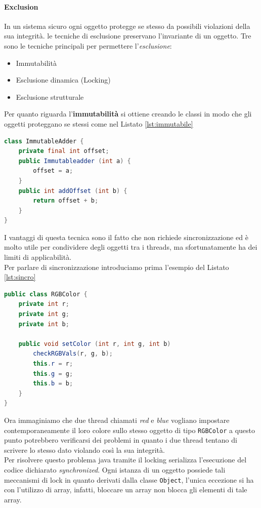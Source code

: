 \paragraph{Exclusion}
In un sistema sicuro ogni oggetto protegge se stesso da possibili violazioni della sua integrità. le tecniche di esclusione preservano l'invariante di un oggetto. Tre sono le tecniche principali per permettere l'\emph{esclusione}:
\begin{itemize}
\item Immutabilità
\item Esclusione dinamica (Locking)
\item Esclusione strutturale
\end{itemize}
Per quanto riguarda l'\textbf{immutabilità} si ottiene creando le classi in modo che gli oggetti proteggano se stessi come nel  Listato \ref{lst:immutabile}
\begin{lstlisting}[language=Java,caption={Esempio di oggetto immutabile},label=lst:immutabile]
class ImmutableAdder {
	private final int offset;
	public Immutableadder (int a) {
		offset = a;
	}
	public int addOffset (int b) {
		return offset + b;
	}
}
\end{lstlisting}
I vantaggi di questa tecnica sono il fatto che non richiede sincronizzazione ed è molto utile per condividere degli oggetti tra i threads, ma sfortunatamente ha dei limiti di applicabilità.\\
Per parlare di sincronizzazione introduciamo prima l'esempio del  Listato \ref{lst:sincro}
\begin{lstlisting}[language=Java,caption={Esempio sincronizzazione},label=lst:sincro]
public class RGBColor {
	private int r;
	private int g;
	private int b;
	
	public void setColor (int r, int g, int b)
		checkRGBVals(r, g, b);
		this.r = r;
		this.g = g;
		this.b = b;
	}
}
\end{lstlisting}
Ora immaginiamo che due thread chiamati \emph{red} e \emph{blue} vogliano impostare contemporaneamente il loro colore sullo stesso oggetto di tipo \texttt{RGBColor} a questo punto potrebbero verificarsi dei problemi in quanto i due thread tentano di scrivere lo stesso dato violando così la sua integrità.\\
Per risolvere questo problema java tramite il locking serializza l'esecuzione del codice dichiarato \emph{synchronized}. Ogni istanza di un oggetto possiede tali meccanismi di lock in quanto derivati dalla classe \texttt{Object}, l'unica eccezione si ha con l'utilizzo di array, infatti, bloccare un array non blocca gli elementi di tale array.\\
